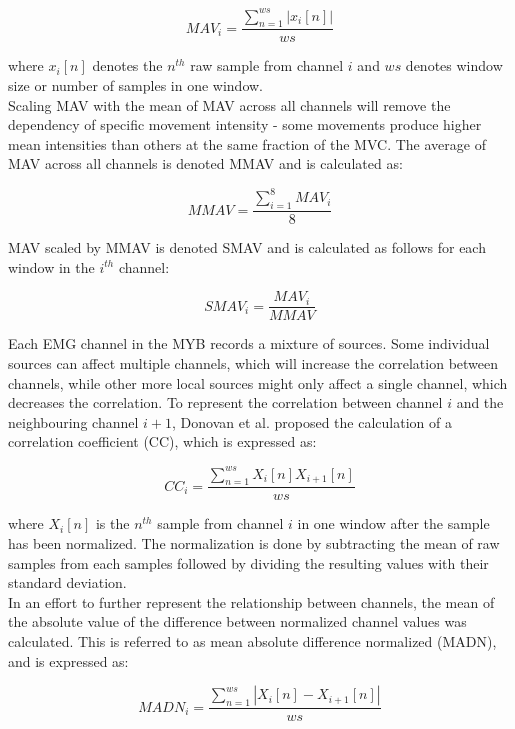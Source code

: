 \begin{equation} \label{eq:MAV}
MAV_i=\frac{\sum\limits_{n=1}^{ws}|x_i[n]|}{ws}
\end{equation}

where $x_i[n]$ denotes the $n^{th}$ raw sample from channel $i$ and $ws$ denotes window size or number of samples in one window. \\
Scaling MAV with the mean of MAV across all channels will remove the dependency of specific movement intensity - some movements produce higher mean intensities than others at the same fraction of the MVC. The average of MAV across all channels is denoted MMAV and is calculated as: 

\begin{equation} \label{eq:MMAV}
MMAV=\frac{\sum\limits_{i=1}^{8}MAV_i}{8}
\end{equation}

MAV scaled by MMAV is denoted SMAV and is calculated as follows for each window in the $i^{th}$ channel:

\begin{equation} \label{eq:SMAV}
SMAV_i=\frac{MAV_i}{MMAV}
\end{equation}

Each EMG channel in the MYB records a mixture of sources. Some individual sources can affect multiple channels, which will increase the correlation between channels, while other more local sources might only affect a single channel, which decreases the correlation. To represent the correlation between channel $i$ and the neighbouring channel $i+1$, Donovan et al. proposed the calculation of a correlation coefficient (CC), which is expressed as: 

\begin{equation} \label{eq:CC}
CC_i=\frac{\sum\limits_{n=1}^{ws}X_i[n]X_{i+1}[n]}{ws}
\end{equation}

where $X_i[n]$ is the $n^{th}$ sample from channel $i$ in one window after the sample has been normalized. The normalization is done by subtracting the mean of raw samples from each samples followed by dividing the resulting values with their standard deviation.  \\
In an effort to further represent the relationship between channels, the mean of the absolute value of the difference between normalized channel values was calculated. This is referred to as mean absolute difference normalized (MADN), and is expressed as:

\begin{equation} \label{eq:MADN}
MADN_i=\frac{\sum\limits_{n=1}^{ws}|X_i[n]-X_{i+1}[n]|}{ws}
\end{equation}


